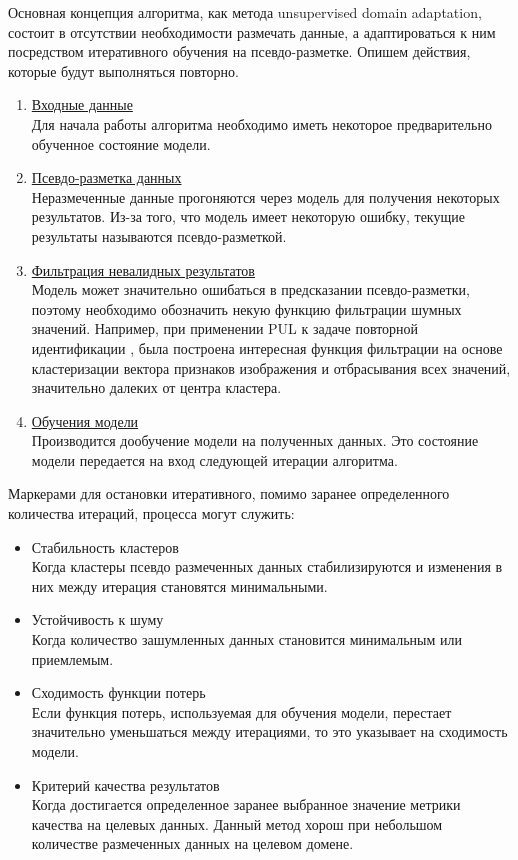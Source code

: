 Основная концепция алгоритма, как метода unsupervised domain adaptation, состоит в отсутствии необходимости размечать данные, а адаптироваться к ним посредством итеративного обучения на псевдо-разметке. Опишем действия, которые будут выполняться повторно.

\begin{enumerate}

\item \underline{Входные данные}\\
Для начала работы алгоритма необходимо иметь некоторое предварительно обученное состояние модели.

\item \underline{Псевдо-разметка данных}\\ 
Неразмеченные данные прогоняются через модель для получения некоторых результатов. Из-за того, что модель имеет некоторую ошибку, текущие результаты называются псевдо-разметкой.

\item \underline{Фильтрация невалидных результатов}\\
Модель может значительно ошибаться в предсказании псевдо-разметки, поэтому необходимо обозначить некую функцию фильтрации шумных значений. Например, при применении PUL к задаче повторной идентификации \cite{pul_person}, была построена интересная функция фильтрации на основе кластеризации вектора признаков изображения и отбрасывания всех значений, значительно далеких от центра кластера.

\item \underline{Обучения модели}\\
Производится дообучение модели на полученных данных. Это состояние модели передается на вход следующей итерации алгоритма. 
\end{enumerate}

Маркерами для остановки итеративного, помимо заранее определенного количества итераций, процесса могут служить:
\begin{itemize}
\item Стабильность кластеров\\
Когда кластеры псевдо размеченных данных стабилизируются и изменения в них между итерация становятся минимальными.
\item Устойчивость к шуму\\
Когда количество зашумленных данных становится минимальным или приемлемым.
\item Сходимость функции потерь\\
Если функция потерь, используемая для обучения модели, перестает значительно уменьшаться между итерациями, то это указывает на сходимость модели.
\item Критерий качества результатов\\
Когда достигается определенное заранее выбранное значение метрики качества на целевых данных. Данный метод хорош при небольшом количестве размеченных данных на целевом домене.
\end{itemize}

